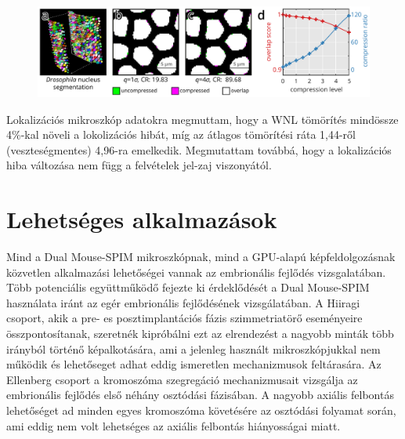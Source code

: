 \documentclass{booklet_style}
\begin{document}
    \begin{figure}
      \centering
      \includegraphics[page=1,width=\textwidth]{4_gpu/LLvsB3D}
      \label{fig:wnlDroso}
    \end{figure}

    Lokalizációs mikroszkóp adatokra megmuttam, hogy a WNL tömörítés mindössze 4\%-kal növeli a lokolizációs hibát, míg az átlagos tömörítési ráta 1,44-ről (veszteségmentes) 4,96-ra emelkedik. Megmutattam továbbá, hogy a lokalizációs hiba változása nem függ a felvételek jel-zaj viszonyától.

    


\section{Lehetséges alkalmazások}
Mind a Dual Mouse-SPIM mikroszkópnak, mind a GPU-alapú képfeldolgozásnak közvetlen alkalmazási lehetőségei vannak az embrionális fejlődés vizsgalatában. Több potenciális együttműködő fejezte ki érdeklődését a Dual Mouse-SPIM használata iránt az egér embrionális fejlődésének vizsgálatában. A Hiiragi
csoport, akik a pre- es posztimplantációs fázis szimmetriatörő eseményeire összpontosítanak, szeretnék kipróbálni ezt az elrendezést a nagyobb minták több irányból történő képalkotására, ami a jelenleg használt mikroszkópjukkal nem működik és lehetőseget adhat eddig ismeretlen mechanizmusok feltárasára. Az Ellenberg csoport a kromoszóma szegregáció mechanizmusait vizsgálja az embrionális fejlődés első néhány osztódási fázisában. A nagyobb axiális felbontás lehetőséget ad minden egyes kromoszóma követésére az osztódási folyamat során, ami eddig nem volt lehetséges az axiális felbontás hiányosságai miatt.
\end{document}
